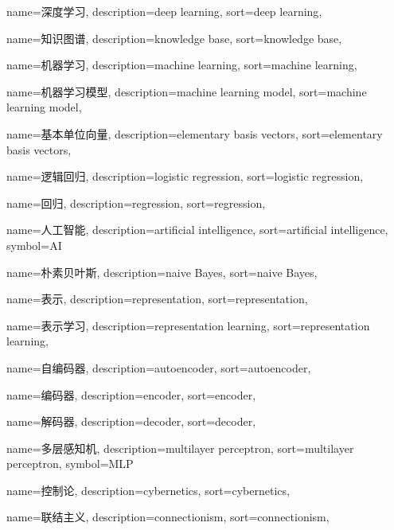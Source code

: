 {
  name=深度学习,
  description={deep learning},
  sort={deep learning},
}

{
  name=知识图谱,
  description={knowledge base},
  sort={knowledge base},
}

{
  name=机器学习,
  description={machine learning},
  sort={machine learning},
}

{
  name=机器学习模型,
  description={machine learning model},
  sort={machine learning model},
}

{
  name=基本单位向量,
  description={elementary basis vectors},
  sort={elementary basis vectors},
}

{
  name=逻辑回归,
  description={logistic regression},
  sort={logistic regression},
}

{
  name=回归,
  description={regression},
  sort={regression},
}

{
  name=人工智能,
  description={artificial intelligence},
  sort={artificial intelligence},
  symbol={AI}
}

{
  name=朴素贝叶斯,
  description={naive Bayes},
  sort={naive Bayes},
}

{
  name=表示,
  description={representation},
  sort={representation},
}

{
  name=表示学习,
  description={representation learning},
  sort={representation learning},
}

{
  name=自编码器,
  description={autoencoder},
  sort={autoencoder},
}

{
  name=编码器,
  description={encoder},
  sort={encoder},
}

{
  name=解码器,
  description={decoder},
  sort={decoder},
}

{
  name=多层感知机,
  description={multilayer perceptron},
  sort={multilayer perceptron},
  symbol={MLP}
}

{
  name=控制论,
  description={cybernetics},
  sort={cybernetics},
}

{
  name=联结主义,
  description={connectionism},
  sort={connectionism},
}


